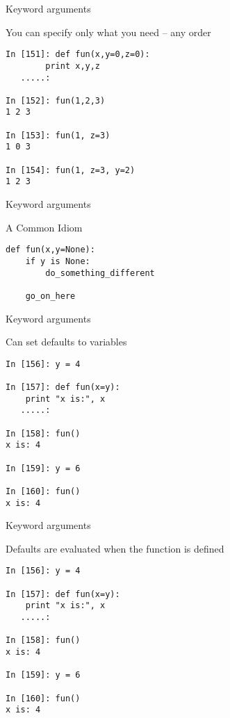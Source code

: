 \documentclass{beamer}
\begin{document}
\begin{frame}[fragile]{Keyword arguments}

 {\Large You can specify only what you need -- any order}

\begin{verbatim}
In [151]: def fun(x,y=0,z=0):
        print x,y,z
   .....:     

In [152]: fun(1,2,3)
1 2 3

In [153]: fun(1, z=3)
1 0 3

In [154]: fun(1, z=3, y=2)
1 2 3
\end{verbatim}

\end{frame} 

\begin{frame}[fragile]{Keyword arguments}

 {\Large A Common Idiom}

\vfill
\begin{verbatim}
def fun(x,y=None):
    if y is None:
        do_something_different

    go_on_here
\end{verbatim}
\vfill

\end{frame} 

\begin{frame}[fragile]{Keyword arguments}

 {\Large Can set defaults to variables}

\begin{verbatim}
In [156]: y = 4

In [157]: def fun(x=y):
    print "x is:", x
   .....:     

In [158]: fun()
x is: 4

In [159]: y = 6

In [160]: fun()
x is: 4
\end{verbatim}

\end{frame} 

\begin{frame}[fragile]{Keyword arguments}

{\Large Defaults are evaluated when the function is defined}

\begin{verbatim}
In [156]: y = 4

In [157]: def fun(x=y):
    print "x is:", x
   .....:     

In [158]: fun()
x is: 4

In [159]: y = 6

In [160]: fun()
x is: 4
\end{verbatim}

\end{frame} 
\end{document}
